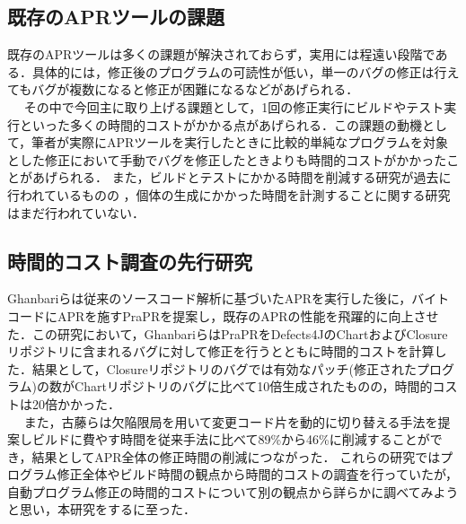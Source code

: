 \documentclass[uplatex,dvipdfmx,a4paper]{jsarticle}
\let\oldcite\cite
\renewcommand{\cite}[1]{\xspace\oldcite{#1}}
\begin{document}
\subsection{既存のAPRツールの課題} \label{sec:prev_challenge}
既存のAPRツールは多くの課題が解決されておらず\cite{le2013current}，実用には程遠い段階である．具体的には，修正後のプログラムの可読性が低い\cite{smith2015cure}，単一のバグの修正は行えてもバグが複数になると修正が困難になる\cite{saha2019harnessing}などがあげられる．\\　
その中で今回主に取り上げる課題として，1回の修正実行にビルドやテスト実行といった多くの時間的コストがかかる点\cite{chen2017contract}があげられる．この課題の動機として，筆者が実際にAPRツールを実行したときに比較的単純なプログラムを対象とした修正において手動でバグを修正したときよりも時間的コストがかかったことがあげられる．
また，ビルドとテストにかかる時間を削減する研究が過去に行われているものの\cite{id692}
，個体の生成にかかった時間を計測することに関する研究はまだ行われていない．
\subsection{時間的コスト調査の先行研究}
Ghanbari\cite{ghanbari2019practical}らは従来のソースコード解析に基づいたAPRを実行した後に，バイトコードにAPRを施すPraPRを提案し，既存のAPRの性能を飛躍的に向上させた．この研究において，GhanbariらはPraPRをDefects4JのChartおよびClosureリポジトリに含まれるバグに対して修正を行うとともに時間的コストを計算した．結果として，Closureリポジトリのバグでは有効なパッチ(修正されたプログラム)の数がChartリポジトリのバグに比べて10倍生成されたものの，時間的コストは20倍かかった．\\　
また，古藤\cite{id692}らは欠陥限局を用いて変更コード片を動的に切り替える手法を提案しビルドに費やす時間を従来手法に比べて89\%から46\%に削減することができ，結果としてAPR全体の修正時間の削減につながった．
これらの研究ではプログラム修正全体やビルド時間の観点から時間的コストの調査を行っていたが，自動プログラム修正の時間的コストについて別の観点から詳らかに調べてみようと思い，本研究をするに至った．
\clearpage
\end{document}

